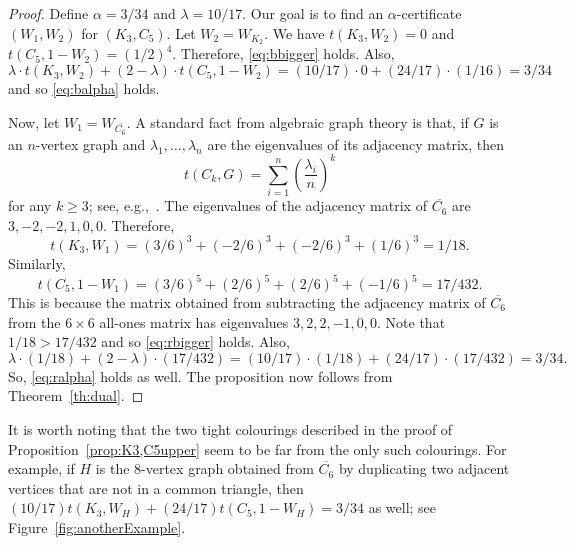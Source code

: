 \documentclass[12pt]{article}
\numberwithin{equation}{section}
\theoremstyle{definition}
\theoremstyle{remark}
\begin{document}
\begin{proof}
Define $\alpha=3/34$ and $\lambda=10/17$. Our goal is to find an $\alpha$-certificate $(W_1,W_2)$ for $(K_3,C_5)$. Let $W_2=W_{K_2}$. We have $t(K_3,W_2)=0$ and $t(C_5,1-W_2)=(1/2)^4$. Therefore, \eqref{eq:bbigger} holds. Also,
\[\lambda\cdot t(K_3,W_2) + (2-\lambda)\cdot t(C_5,1-W_2)=(10/17)\cdot 0 + (24/17)\cdot(1/16) = 3/34\]
and so \eqref{eq:balpha} holds. 

Now, let $W_1=W_{\overline{C_6}}$. A standard fact from algebraic graph theory is that, if $G$ is an $n$-vertex graph and $\lambda_1,\dots,\lambda_n$ are the eigenvalues of its adjacency matrix, then
\[t(C_k,G)=\sum_{i=1}^n\left(\frac{\lambda_i}{n}\right)^k\]
for any $k\geq3$; see, e.g.,~\cite[Example~5.11]{Lovasz12}. The eigenvalues of the adjacency matrix of $\overline{C_6}$ are $3,-2,-2,1,0,0$. Therefore, 
\[t(K_3,W_1)=(3/6)^3 + (-2/6)^3 + (-2/6)^3+(1/6)^3 = 1/18.\]
Similarly, 
\[t(C_5,1-W_1)=(3/6)^5 + (2/6)^5 + (2/6)^5+(-1/6)^5 = 17/432.\]
This is because the matrix obtained from subtracting the adjacency matrix of $\overline{C_6}$ from the $6\times 6$ all-ones matrix has eigenvalues $3,2,2,-1,0,0$. Note that $1/18>17/432$ and so \eqref{eq:rbigger} holds. Also, 
\[\lambda\cdot (1/18) + (2-\lambda)\cdot (17/432) = (10/17)\cdot (1/18)+(24/17)\cdot(17/432)=3/34.\]
So, \eqref{eq:ralpha} holds as well. The proposition now follows from Theorem~\ref{th:dual}.
\end{proof}



It is worth noting that the two tight colourings described in the proof of Proposition~\ref{prop:K3,C5upper} seem to be far from the only such colourings. For example, if $H$ is the $8$-vertex graph obtained from $\overline{C_6}$ by duplicating two adjacent vertices that are not in a common triangle, then $(10/17)t(K_3,W_H) + (24/17)t(C_5,1-W_H)=3/34$ as well; see Figure~\ref{fig:anotherExample}.
\end{document}
